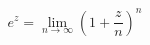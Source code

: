 

\fontsize{25}{25}\selectfont
\[
            
            
            
            
            e^{z} = \lim_{n \to \infty} \left( 1 +
            \frac{z}{n} \right)^{n}
            
            
            
            
            
            
\]

